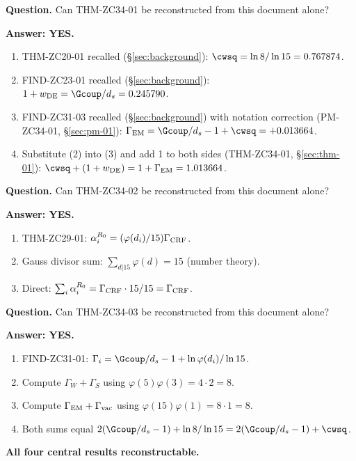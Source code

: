 \documentclass[12pt, a4paper]{article}
\begin{document}
\begin{formalbox}[title={Reconstruction Test (CUIP No-Loss)}]
\textbf{Question.} Can THM-ZC34-01 be reconstructed from this
document alone?

\textbf{Answer: YES.}
\begin{enumerate}[leftmargin=*, noitemsep]
  \item THM-ZC20-01 recalled (\S\ref{sec:background}):
    $\cwsq = \ln 8/\ln 15 = 0.767874$.
  \item FIND-ZC23-01 recalled (\S\ref{sec:background}):
    $1 + w_{\rm DE} = \Gcoup/d_s = 0.245790$.
  \item FIND-ZC31-03 recalled (\S\ref{sec:background}) with
    notation correction (PM-ZC34-01, \S\ref{sec:pm-01}):
    $\Gamma_{\rm EM} = \Gcoup/d_s - 1 + \cwsq = +0.013664$.
  \item Substitute (2) into (3) and add 1 to both sides
    (THM-ZC34-01, \S\ref{sec:thm-01}):
    $\cwsq + (1+w_{\rm DE}) = 1 + \Gamma_{\rm EM} = 1.013664$.
\end{enumerate}

\medskip
\textbf{Question.} Can THM-ZC34-02 be reconstructed from this
document alone?

\textbf{Answer: YES.}
\begin{enumerate}[leftmargin=*, noitemsep]
  \item THM-ZC29-01: $\alpha_i^{R_0} = (\varphi(d_i)/15)
    \Gamma_{\rm CRF}$.
  \item Gauss divisor sum: $\sum_{d|15}\varphi(d) = 15$ (number
    theory).
  \item Direct: $\sum_i\alpha_i^{R_0} = \Gamma_{\rm CRF}\cdot
    15/15 = \Gamma_{\rm CRF}$.
\end{enumerate}

\medskip
\textbf{Question.} Can THM-ZC34-03 be reconstructed from this
document alone?

\textbf{Answer: YES.}
\begin{enumerate}[leftmargin=*, noitemsep]
  \item FIND-ZC31-01: $\Gamma_i = \Gcoup/d_s - 1 +
    \ln\varphi(d_i)/\ln 15$.
  \item Compute $\Gamma_W + \Gamma_S$ using $\varphi(5)\varphi(3)
    = 4\cdot 2 = 8$.
  \item Compute $\Gamma_{\rm EM} + \Gamma_{\rm vac}$ using
    $\varphi(15)\varphi(1) = 8\cdot 1 = 8$.
  \item Both sums equal $2(\Gcoup/d_s - 1) + \ln 8/\ln 15
    = 2(\Gcoup/d_s - 1) + \cwsq$.
\end{enumerate}

\textbf{All four central results reconstructable.}
\end{formalbox}
\end{document}
